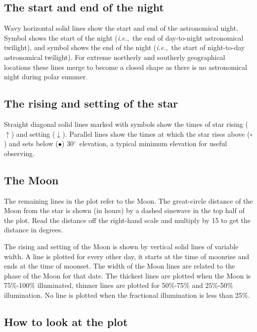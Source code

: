 \documentclass[11pt,noabs]{starlink}
\providecommand{\degrees}{\hbox{$^\circ$}}
\begin{document}
\subsection{The start and end of the night}

Wavy horizontal solid lines show the start and end of the  astronomical
night.  Symbol {}  shows the start of the night ({\em{i.e.}},~the
end of day-to-night astronomical  twilight), and  symbol {} shows
the end of the night ({\em{i.e.}},~the start of night-to-day
astronomical twilight). For extreme  northerly and southerly
geographical locations these lines merge to become a closed shape as
there is no astronomical night during polar summer.

\subsection{The rising and setting of the star}

Straight diagonal solid lines marked with symbols  show the times of
star rising ($\uparrow$) and setting ($\downarrow$). Parallel lines
show the times at  which the star rises above ($\circ$) and sets below
($\bullet$) 30\degrees\ elevation, a typical minimum elevation for
useful observing.

\subsection{The Moon}

The remaining lines in the plot refer to the Moon. The great-circle
distance of the Moon from the star is shown (in hours) by a dashed
sinewave in the top half of the plot. Read the distance off the
right-hand scale and multiply by 15 to get the distance in degrees.

The rising and setting of the Moon is shown by vertical solid lines of
variable width.  A line is plotted for every other day, it starts at
the time of moonrise and ends at the time of moonset.  The width of the
Moon lines are related to the phase of  the Moon for that date. The
thickest lines are plotted when the Moon is  75\%-100\% illuminated,
thinner lines are plotted for 50\%-75\% and 25\%-50\% illumination. No
line is plotted when the fractional illumination is less than  25\%.

\subsection{How to look at the plot}
\end{document}
